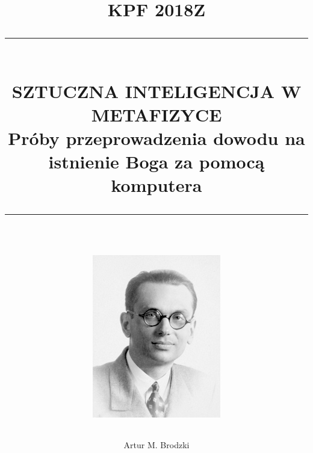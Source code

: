 \documentclass[12pt]{article}
\newcommand{\HRule}[1]{\rule{\linewidth}{#1}}
\begin{document}
\title{ \textsc{KPF 2018Z}
		\\ %
		\HRule{0.5pt} \\
		\LARGE \textbf{\uppercase{
		    Sztuczna inteligencja w metafizyce} \\ 
	    \normalsize Próby przeprowadzenia dowodu na istnienie Boga za pomocą komputera }
		\HRule{2pt} \\ [0.5cm]
		\includegraphics[width=0.5\linewidth]{goedel.jpg}
		}


\author{Artur M. Brodzki }


\maketitle
\newpage
{}

\renewcommand\tablename{Tabela}

\newtheorem{theorem}{Twierdzenie}
\newtheorem{definition}{Definicja}
\newtheorem{axiom}{Aksjomat}
\newtheorem{axiom-g}{Aksjomat}
\newtheorem{definition-g}{Definicja}
\newtheorem{theorem-g}{Twierdzenie}
\newtheorem{lemma}{Lemat}
\newtheorem{corollary}{Fakt}

\sectionfont{\scshape}
\end{document}
